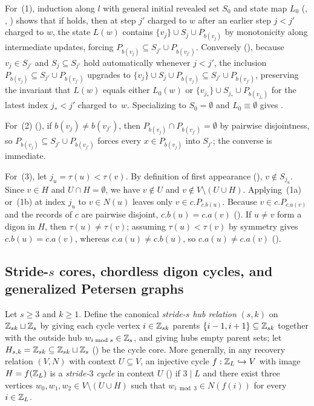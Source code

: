 \begin{outline}
For~(1), induction along $l$ with general initial revealed set $S_0$ and state map $L_0$ (,
, ) shows that if  holds, then at step
$j'$ charged to $w$ after an earlier step $j < j'$ charged to $w$, the state $L(w)$ contains $\{v_j\} \cup S_j \cup
P_{b(v_j)}$ by monotonicity along intermediate updates, forcing $P_{b(v_j)} \subseteq S_{j'} \cup P_{b(v_{j'})}$.
Conversely (), because $v_j \in S_{j'}$ and $S_j \subseteq S_{j'}$ hold automatically whenever
$j < j'$, the inclusion $P_{b(v_j)} \subseteq S_{j'} \cup P_{b(v_{j'})}$ upgrades to $\{v_j\} \cup S_j \cup P_{b(v_j)}
\subseteq S_{j'} \cup P_{b(v_{j'})}$, preserving the invariant that $L(w)$ equals either $L_0(w)$ or $\{v_{j_*}\} \cup
S_{j_*} \cup P_{b(v_{j_*})}$ for the latest index $j_* < j'$ charged to~$w$. Specializing to $S_0 = \emptyset$ and
$L_0 \equiv \emptyset$ gives .

For~(2) (), if $b(v_j) \ne b(v_{j'})$, then $P_{b(v_j)} \cap P_{b(v_{j'})} = \emptyset$ by
pairwise disjointness, so $P_{b(v_j)} \subseteq S_{j'} \cup P_{b(v_{j'})}$ forces every $x \in P_{b(v_j)}$ into $S_{j'}$;
the converse is immediate.

For~(3), let $j_u = \tau(u) < \tau(v)$. By definition of first appearance (),
$v \notin S_{j_u}$. Since $v \in H$ and $U \cap H = \emptyset$, we have $v \notin U$ and $v \notin V \setminus (U \cup H)$.
Applying~(1a) or~(1b) at index $j_u$ to $v \in N(u)$ leaves only $v \in c.P_{c.b(u)}$. Because $v \in c.P_{c.a(v)}$ and
the records of $c$ are pairwise disjoint, $c.b(u) = c.a(v)$ (). If $u \ne v$ form
a digon in $H$, then $\tau(u) \ne \tau(v)$; assuming $\tau(u) < \tau(v)$ by symmetry gives $c.b(u) = c.a(v)$, whereas
$c.a(u) \ne c.b(u)$, so $c.a(u) \ne c.a(v)$ ().
\end{outline}

\subsection{Stride-\texorpdfstring{$s$}{s} cores, chordless digon cycles, and generalized Petersen graphs}\label{sec:reciprocity-cycles}

Let $s \ge 3$ and $k \ge 1$. Define the canonical \emph{stride-$s$ hub relation} $(s, k)$ on
$\mathbb{Z}_{sk} \sqcup \mathbb{Z}_s$ by giving each cycle vertex $i \in \mathbb{Z}_{sk}$ parents $\{i - 1, i + 1\} \subseteq \mathbb{Z}_{sk}$ together
with the outside hub $w_{i \bmod s} \in \mathbb{Z}_s$, and giving hubs empty parent sets; let $H_{s,k} = \mathbb{Z}_{sk} \subseteq
\mathbb{Z}_{sk} \sqcup \mathbb{Z}_s$ () be the cycle core. More generally, in any recovery relation $(V, N)$ with
context $U \subseteq V$, an injective cycle $f : \mathbb{Z}_L \hookrightarrow V$ with image $H = f(\mathbb{Z}_L)$ is a \emph{stride-$3$
cycle} in context $U$ () if $3 \mid L$ and there exist three vertices $w_0, w_1, w_2 \in V \setminus
(U \cup H)$ such that $w_{i \bmod 3} \in N(f(i))$ for every $i \in \mathbb{Z}_L$.

